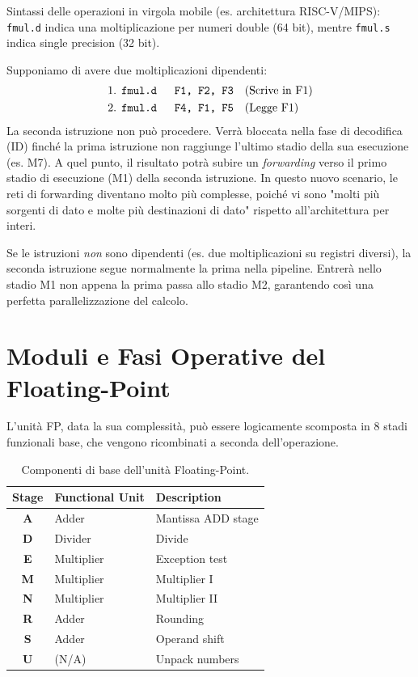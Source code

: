 \begin{example}
Sintassi delle operazioni in virgola mobile (es. architettura RISC-V/MIPS): \texttt{fmul.d} indica una moltiplicazione per numeri double (64 bit), mentre \texttt{fmul.s} indica single precision (32 bit).

Supponiamo di avere due moltiplicazioni dipendenti:
\begin{align*}
    &\text{1. } \texttt{fmul.d \quad F1, F2, F3} \quad \text{(Scrive in F1)}\\
    &\text{2. } \texttt{fmul.d \quad F4, F1, F5} \quad \text{(Legge F1)}
\end{align*}
La seconda istruzione non può procedere. Verrà bloccata nella fase di decodifica (ID) finché la prima istruzione non raggiunge l'ultimo stadio della sua esecuzione (es. M7). A quel punto, il risultato potrà subire un \textit{forwarding} verso il primo stadio di esecuzione (M1) della seconda istruzione. 
In questo nuovo scenario, le reti di forwarding diventano molto più complesse, poiché vi sono "molti più sorgenti di dato e molte più destinazioni di dato" rispetto all'architettura per interi.
\end{example}

\begin{remark}
Se le istruzioni \textit{non} sono dipendenti (es. due moltiplicazioni su registri diversi), la seconda istruzione segue normalmente la prima nella pipeline. Entrerà nello stadio M1 non appena la prima passa allo stadio M2, garantendo così una perfetta parallelizzazione del calcolo.
\end{remark}

\section{Moduli e Fasi Operative del Floating-Point}
L'unità FP, data la sua complessità, può essere logicamente scomposta in 8 stadi funzionali base, che vengono ricombinati a seconda dell'operazione.

\begin{table}[H]
    \centering
    \begin{tabular}{cll}
        \toprule
        \textbf{Stage} & \textbf{Functional Unit} & \textbf{Description} \\
        \midrule
        \textbf{A} & Adder & Mantissa ADD stage \\
        \textbf{D} & Divider & Divide \\
        \textbf{E} & Multiplier & Exception test \\
        \textbf{M} & Multiplier & Multiplier I \\
        \textbf{N} & Multiplier & Multiplier II \\
        \textbf{R} & Adder & Rounding \\
        \textbf{S} & Adder & Operand shift \\
        \textbf{U} & (N/A) & Unpack numbers \\
        \bottomrule
    \end{tabular}
    \caption{Componenti di base dell'unità Floating-Point.}
    \label{tab:fp_stages}
\end{table}

